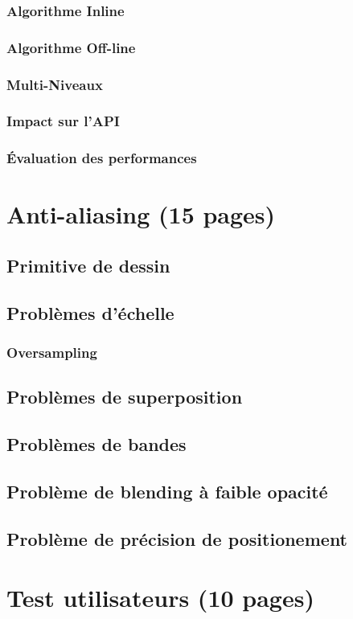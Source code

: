		\subsection{Algorithme Inline}
		\subsection{Algorithme Off-line}
		\subsection{Multi-Niveaux}
		\subsection{Impact sur l'API}
		\subsection{Évaluation des performances}

\chapter{Anti-aliasing (15 pages) }
	\section{Primitive de dessin}
	\section{Problèmes d'échelle}
		\subsection{Oversampling}
	\section{Problèmes de superposition}
	\section{Problèmes de bandes}
	\section{Problème de blending à faible opacité}
	\section{Problème de précision de positionement}
\chapter{Test utilisateurs (10 pages) }
